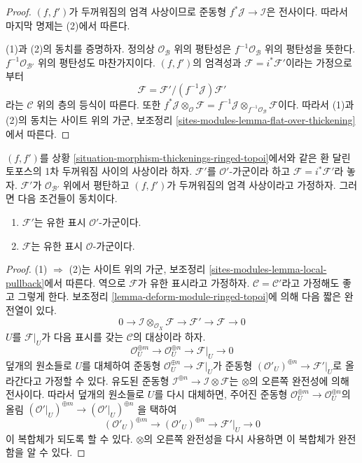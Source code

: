 \begin{proof}
$(f, f')$가 두꺼워짐의 엄격 사상이므로 준동형
$f^*\mathcal{J} \to \mathcal{I}$은 전사이다. 따라서 마지막 명제는
(2)에서 따른다.

\medskip\noindent
(1)과 (2)의 동치를 증명하자. 정의상 $\mathcal{O}_\mathcal{B}$ 위의
평탄성은 $f^{-1}\mathcal{O}_\mathcal{B}$ 위의 평탄성을 뜻한다.
$f^{-1}\mathcal{O}_{\mathcal{B}'}$ 위의 평탄성도 마찬가지이다.
$(f, f')$의 엄격성과 $\mathcal{F} = i^*\mathcal{F}'$이라는 가정으로부터
$$
\mathcal{F} = \mathcal{F}'/(f^{-1}\mathcal{J})\mathcal{F}'
$$
라는 $\mathcal{C}$ 위의 층의 등식이 따른다. 또한
$f^*\mathcal{J} \otimes_\mathcal{O} \mathcal{F} =
f^{-1}\mathcal{J} \otimes_{f^{-1}\mathcal{O}_\mathcal{B}} \mathcal{F}$이다.
따라서 (1)과 (2)의 동치는 사이트 위의 가군, 보조정리
\ref{sites-modules-lemma-flat-over-thickening}에서 따른다.
\end{proof}

\begin{lemma}
\label{lemma-deform-fp-module-ringed-topoi}
$(f, f')$를 상황 \ref{situation-morphism-thickenings-ringed-topoi}에서와
같은 환 달린 토포스의 1차 두꺼워짐 사이의 사상이라 하자.
$\mathcal{F}'$를 $\mathcal{O}'$-가군이라 하고
$\mathcal{F} = i^*\mathcal{F}'$라 놓자. $\mathcal{F}'$가
$\mathcal{O}_{\mathcal{B}'}$ 위에서 평탄하고 $(f, f')$가 두꺼워짐의
엄격 사상이라고 가정하자. 그러면 다음 조건들이 동치이다.
\begin{enumerate}
\item $\mathcal{F}'$는 유한 표시 $\mathcal{O}'$-가군이다.
\item $\mathcal{F}$는 유한 표시 $\mathcal{O}$-가군이다.
\end{enumerate}
\end{lemma}

\begin{proof}
(1) $\Rightarrow$ (2)는 사이트 위의 가군, 보조정리
\ref{sites-modules-lemma-local-pullback}에서 따른다. 역으로
$\mathcal{F}$가 유한 표시라고 가정하자. $\mathcal{C} = \mathcal{C}'$라고
가정해도 좋고 그렇게 한다. 보조정리
\ref{lemma-deform-module-ringed-topoi}에 의해 다음 짧은 완전열이 있다.
$$
0 \to \mathcal{I} \otimes_{\mathcal{O}_X} \mathcal{F} \to
\mathcal{F}' \to \mathcal{F} \to 0
$$
$U$를 $\mathcal{F}|_U$가 다음 표시를 갖는 $\mathcal{C}$의 대상이라 하자.
$$
\mathcal{O}_U^{\oplus m} \to \mathcal{O}_U^{\oplus n} \to \mathcal{F}|_U \to 0
$$
덮개의 원소들로 $U$를 대체하여 준동형
$\mathcal{O}_U^{\oplus n} \to \mathcal{F}|_U$가 준동형
$(\mathcal{O}'_U)^{\oplus n} \to \mathcal{F}'|_U$로 올라간다고 가정할 수
있다. 유도된 준동형 $\mathcal{I}^{\oplus n} \to
\mathcal{I} \otimes \mathcal{F}$는 $\otimes$의 오른쪽 완전성에 의해
전사이다. 따라서 덮개의 원소들로 $U$를 다시 대체하면, 주어진 준동형
$\mathcal{O}_U^{\oplus m} \to \mathcal{O}_U^{\oplus n}$의 올림
$(\mathcal{O}'|_U)^{\oplus m} \to (\mathcal{O}'|_U)^{\oplus n}$
을 택하여
$$
(\mathcal{O}'_U)^{\oplus m} \to (\mathcal{O}'_U)^{\oplus n} \to
\mathcal{F}'|_U \to 0
$$
이 복합체가 되도록 할 수 있다. $\otimes$의 오른쪽 완전성을 다시
사용하면 이 복합체가 완전함을 알 수 있다.
\end{proof}

